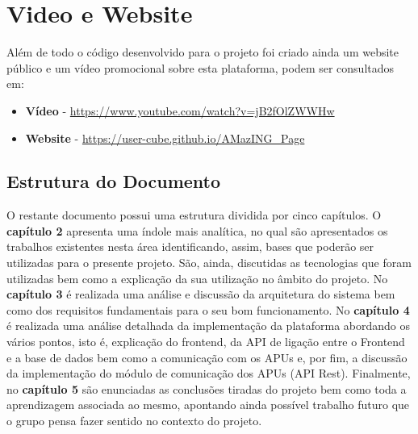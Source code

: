 \section{Video e Website}
Além de todo o código desenvolvido para o projeto foi criado ainda um website público e um vídeo promocional sobre esta plataforma, podem ser consultados em:
\begin{itemize}[noitemsep]
    \item \textbf{Vídeo} - \url{https://www.youtube.com/watch?v=jB2fOlZWWHw}
    \item \textbf{Website} - \url{https://user-cube.github.io/AMazING_Page}
\end{itemize}

\subsection{Estrutura do Documento}
O restante documento possui uma estrutura dividida por cinco capítulos. O \textbf{capítulo 2} apresenta uma índole mais analítica, no qual são apresentados os trabalhos existentes nesta área identificando, assim, bases que poderão ser utilizadas para o presente projeto. São, ainda, discutidas as tecnologias que foram utilizadas bem como a explicação da sua utilização no âmbito do projeto. No \textbf{capítulo 3} é realizada uma análise e discussão da arquitetura do sistema bem como dos requisitos fundamentais para o seu bom funcionamento. No \textbf{capítulo 4} é realizada uma análise detalhada da implementação da plataforma abordando os vários pontos, isto é, explicação do frontend, da API de ligação entre o Frontend e a base de dados bem como a comunicação com os APUs e, por fim, a discussão da implementação do módulo de comunicação dos APUs (API Rest). Finalmente, no \textbf{capítulo 5} são enunciadas as conclusões tiradas do projeto bem como toda a aprendizagem associada ao mesmo, apontando ainda possível trabalho futuro que o grupo pensa fazer sentido no contexto do projeto.
\newpage
\hfill\break